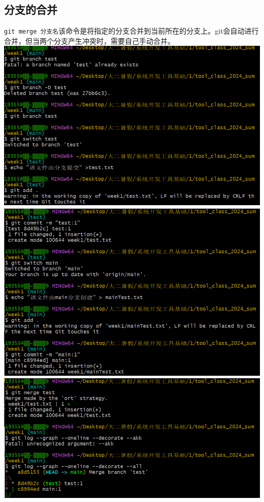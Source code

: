\documentclass[UTF8]{ctexart}
\begin{document}
\subsection{分支的合并}
\verb|git merge 分支名|\quad 该命令是将指定的分支合并到当前所在的分支上。git会自动进行合并，但当两个分支产生冲突时，需要自己手动合并。\\
\includegraphics[width=1\textwidth]{merge1.png}\\
\includegraphics[width=1\textwidth]{merge2.png}\\
\includegraphics[width=1\textwidth]{merge3.png}
\end{document}
